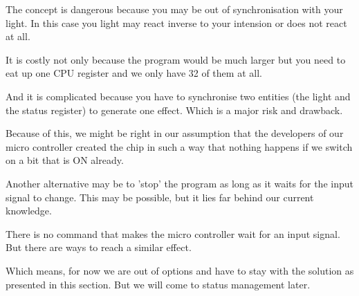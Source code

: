 The concept is dangerous because you may be out of synchronisation with your light. In this case you light may react inverse to your intension or does not react at all.

It is costly not only because the program would be much larger but you need to eat up one CPU register and we only have 32 of them at all.

And it is complicated because you have to synchronise two entities (the light and the status register) to generate one effect. Which is a major risk and drawback.

Because of this, we might be right in our assumption that the developers of our \at micro controller created the chip in such a way that nothing happens if we switch on a bit that is ON already.

Another alternative may be to 'stop' the program as long as it waits for the input signal to change. This may be possible, but it lies far behind our current knowledge.

There is no command that makes the micro controller wait for an input signal. But there are ways to reach a similar effect.

Which means, for now we are out of options and have to stay with the solution as presented in this section. But we will come to status management later.